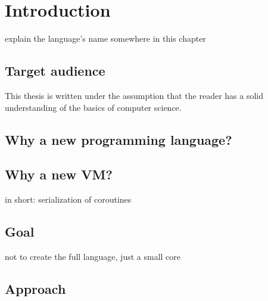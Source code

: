 \chapter{Introduction} %

explain the language's name somewhere in this chapter

    \section{Target audience}
    This thesis is written under the assumption that the reader has a solid understanding of the basics of computer science.
    
    
    \section{Why a new programming language?}
    
    \section{Why a new VM?}
    
    in short: serialization of coroutines
    
    
    \section{Goal} %
    
    not to create the full language, just a small core
    
    
    \section{Approach} %
